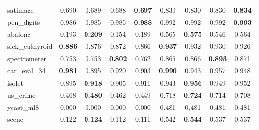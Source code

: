 \begin{figure}[ht]
\begin{tabular}{p{22mm}|*4{p{14mm}}|*4{p{14mm}}}
        satimage&\multicolumn{1}{c}{0.690}&\multicolumn{1}{c}{0.689}&\multicolumn{1}{c}{0.688}&\multicolumn{1}{c|}{\textbf{0.697}}&\multicolumn{1}{c}{0.830}&\multicolumn{1}{c}{0.830}&\multicolumn{1}{c}{0.830}&\multicolumn{1}{c}{\textbf{0.834}}\\
        pen\_digits&\multicolumn{1}{c}{0.986}&\multicolumn{1}{c}{0.985}&\multicolumn{1}{c}{0.985}&\multicolumn{1}{c|}{\textbf{0.988}}&\multicolumn{1}{c}{0.992}&\multicolumn{1}{c}{0.992}&\multicolumn{1}{c}{0.992}&\multicolumn{1}{c}{\textbf{0.993}}\\
        abalone&\multicolumn{1}{c}{0.193}&\multicolumn{1}{c}{\textbf{0.209}}&\multicolumn{1}{c}{0.154}&\multicolumn{1}{c|}{0.189}&\multicolumn{1}{c}{0.565}&\multicolumn{1}{c}{\textbf{0.575}}&\multicolumn{1}{c}{0.546}&\multicolumn{1}{c}{0.564}\\
        sick\_euthyroid&\multicolumn{1}{c}{\textbf{0.886}}&\multicolumn{1}{c}{0.876}&\multicolumn{1}{c}{0.872}&\multicolumn{1}{c|}{0.866}&\multicolumn{1}{c}{\textbf{0.937}}&\multicolumn{1}{c}{0.932}&\multicolumn{1}{c}{0.930}&\multicolumn{1}{c}{0.926}\\
        spectrometer&\multicolumn{1}{c}{0.753}&\multicolumn{1}{c}{0.753}&\multicolumn{1}{c}{\textbf{0.802}}&\multicolumn{1}{c|}{0.762}&\multicolumn{1}{c}{0.866}&\multicolumn{1}{c}{0.866}&\multicolumn{1}{c}{\textbf{0.893}}&\multicolumn{1}{c}{0.871}\\
        car\_eval\_34&\multicolumn{1}{c}{\textbf{0.981}}&\multicolumn{1}{c}{0.895}&\multicolumn{1}{c}{0.920}&\multicolumn{1}{c|}{0.903}&\multicolumn{1}{c}{\textbf{0.990}}&\multicolumn{1}{c}{0.943}&\multicolumn{1}{c}{0.957}&\multicolumn{1}{c}{0.948}\\
        isolet&\multicolumn{1}{c}{0.895}&\multicolumn{1}{c}{\textbf{0.918}}&\multicolumn{1}{c}{0.905}&\multicolumn{1}{c|}{0.911}&\multicolumn{1}{c}{0.943}&\multicolumn{1}{c}{\textbf{0.956}}&\multicolumn{1}{c}{0.949}&\multicolumn{1}{c}{0.952}\\
        us\_crime&\multicolumn{1}{c}{0.468}&\multicolumn{1}{c}{\textbf{0.480}}&\multicolumn{1}{c}{0.462}&\multicolumn{1}{c|}{0.449}&\multicolumn{1}{c}{0.718}&\multicolumn{1}{c}{\textbf{0.724}}&\multicolumn{1}{c}{0.714}&\multicolumn{1}{c}{0.708}\\
        yeast\_ml8&\multicolumn{1}{c}{0.000}&\multicolumn{1}{c}{0.000}&\multicolumn{1}{c}{0.000}&\multicolumn{1}{c|}{0.000}&\multicolumn{1}{c}{0.481}&\multicolumn{1}{c}{0.481}&\multicolumn{1}{c}{0.481}&\multicolumn{1}{c}{0.481}\\
        scene&\multicolumn{1}{c}{0.122}&\multicolumn{1}{c}{\textbf{0.124}}&\multicolumn{1}{c}{0.112}&\multicolumn{1}{c|}{0.111}&\multicolumn{1}{c}{0.542}&\multicolumn{1}{c}{\textbf{0.544}}&\multicolumn{1}{c}{0.537}&\multicolumn{1}{c}{0.537}\\

\end{tabular}
\end{figure}
